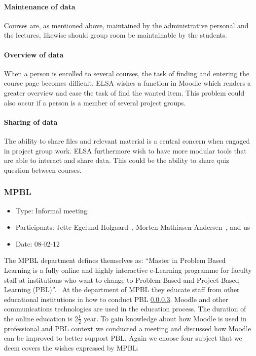 \paragraph{Maintenance of data} Courses are, as mentioned above, maintained by the administrative personal and the lectures, likewise should group room be maintainable by the students. 
\paragraph{Overview of data} When a person is enrolled to several courses, the task of finding and entering the course page becomes difficult. 
ELSA wishes a function in Moodle which renders a greater overview and ease the task of find the wanted item. 
This problem could also occur if a person is a member of several project groups.
\paragraph{Sharing of data} The ability to share files and relevant material is a central concern when engaged in project group work. ELSA furthermore wish to have more modular tools that are able to interact and share data.
This could be the ability to share quiz question between courses. 


\subsubsection{MPBL}
\label{sub:mpblInterview}
\begin{itemize}
	\item Type: Informal meeting
	\item Participants: Jette Egelund Holgaard~\cite{jette}, Morten Mathiasen Andersen~\cite{morten}, and us
	\item Date: 08-02-12
\end{itemize}
The MPBL department defines themselves as:
``Master in Problem Based Learning is a fully online and highly interactive e-Learning programme for faculty staff at institutions who want to change to Problem Based and Project Based Learning (PBL)''.~\cite{mpbl}
At the department of MPBL they educate staff from other educational institutions in how to conduct PBL \ref{}.
Moodle and other communications technologies are used in the education process. 
The duration of the online education is 2$\frac{1}{2}$ year.
To gain knowledge about how Moodle is used in professional and PBL context we conducted a meeting and discussed how Moodle can be improved to better support PBL. Again we choose four subject that we deem covers the wishes expressed by MPBL:

